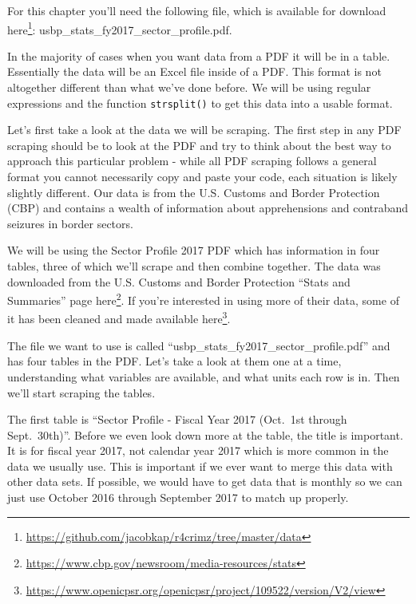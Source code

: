 \documentclass[
]{krantz}
\renewcommand{\href}[2]{#2\footnote{\url{#1}}}
\begin{document}
For this chapter you'll need the following file, which is available for download \href{https://github.com/jacobkap/r4crimz/tree/master/data}{here}: usbp\_stats\_fy2017\_sector\_profile.pdf.

In the majority of cases when you want data from a PDF it will be in a table. Essentially the data will be an Excel file inside of a PDF. This format is not altogether different than what we've done before. We will be using regular expressions and the function \texttt{strsplit()} to get this data into a usable format.

Let's first take a look at the data we will be scraping. The first step in any PDF scraping should be to look at the PDF and try to think about the best way to approach this particular problem - while all PDF scraping follows a general format you cannot necessarily copy and paste your code, each situation is likely slightly different. Our data is from the U.S. Customs and Border Protection (CBP) and contains a wealth of information about apprehensions and contraband seizures in border sectors.

We will be using the Sector Profile 2017 PDF which has information in four tables, three of which we'll scrape and then combine together. The data was downloaded from the U.S. Customs and Border Protection ``Stats and Summaries'' page \href{https://www.cbp.gov/newsroom/media-resources/stats}{here}. If you're interested in using more of their data, some of it has been cleaned and made available \href{https://www.openicpsr.org/openicpsr/project/109522/version/V2/view}{here}.

The file we want to use is called ``usbp\_stats\_fy2017\_sector\_profile.pdf'' and has four tables in the PDF. Let's take a look at them one at a time, understanding what variables are available, and what units each row is in. Then we'll start scraping the tables.

The first table is ``Sector Profile - Fiscal Year 2017 (Oct.~1st through Sept.~30th)''. Before we even look down more at the table, the title is important. It is for fiscal year 2017, not calendar year 2017 which is more common in the data we usually use. This is important if we ever want to merge this data with other data sets. If possible, we would have to get data that is monthly so we can just use October 2016 through September 2017 to match up properly.
\end{document}
